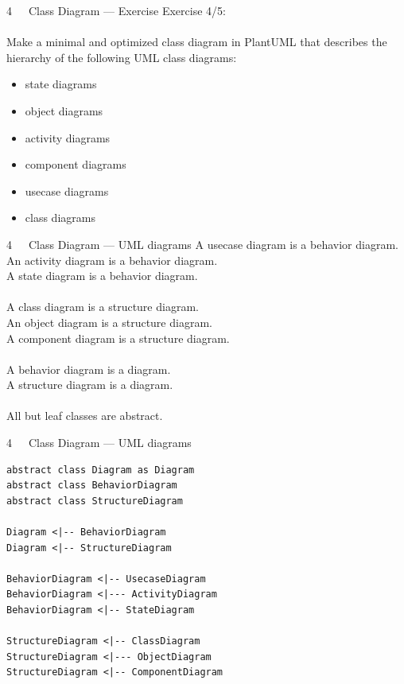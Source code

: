 \documentclass{beamer}
\begin{document}
\begin{frame}{4~~~Class Diagram — Exercise}
Exercise 4/5:
\\\mbox{}\\
Make a minimal and optimized class diagram in PlantUML that describes the hierarchy of the following UML class diagrams:
\\\mbox{}
\begin{itemize}
\item state diagrams
\item object diagrams
\item activity diagrams
\item component diagrams
\item usecase diagrams
\item class diagrams
\end{itemize}
\end{frame}

\begin{frame}{4~~~Class Diagram — UML diagrams}
A usecase diagram \alert{is a} behavior diagram.
\\
An activity diagram \alert{is a} behavior diagram.
\\
A state diagram \alert{is a} behavior diagram.
\\\mbox{}\\
A class diagram \alert{is a} structure diagram.
\\
An object diagram \alert{is a} structure diagram.
\\
A component diagram \alert{is a} structure diagram.
\\\mbox{}\\
A behavior diagram \alert{is a} diagram.
\\
A structure diagram \alert{is a} diagram.
\\\mbox{}\\
All but leaf classes \alert{are} abstract.
\end{frame}

\begin{frame}[fragile]{4~~~Class Diagram — UML diagrams}
\begin{verbatim}
abstract class Diagram as Diagram
abstract class BehaviorDiagram
abstract class StructureDiagram

Diagram <|-- BehaviorDiagram
Diagram <|-- StructureDiagram

BehaviorDiagram <|-- UsecaseDiagram
BehaviorDiagram <|--- ActivityDiagram
BehaviorDiagram <|-- StateDiagram

StructureDiagram <|-- ClassDiagram
StructureDiagram <|--- ObjectDiagram
StructureDiagram <|-- ComponentDiagram
\end{verbatim}
\end{frame}
\end{document}
